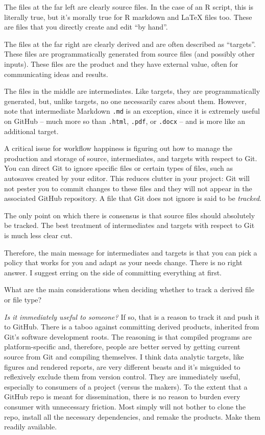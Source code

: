 \documentclass[12pt]{article}
\begin{document}
The files at the far left are clearly source files. In the case of an R
script, this is literally true, but it's morally true for R markdown and
LaTeX files too. These are files that you directly create and edit ``by
hand''.

The files at the far right are clearly derived and are often described
as ``targets''. These files are programmatically generated from source
files (and possibly other inputs). These files are the product and they
have external value, often for communicating ideas and results.

The files in the middle are intermediates. Like targets, they are
programmatically generated, but, unlike targets, no one necessarily
cares about them. However, note that intermediate Markdown \texttt{.md}
is an exception, since it is extremely useful on GitHub -- much more so
than \texttt{.html}, \texttt{.pdf}, or \texttt{.docx} -- and is more
like an additional target.

A critical issue for workflow happiness is figuring out how to manage
the production and storage of source, intermediates, and targets with
respect to Git. You can direct Git to ignore specific files or certain
types of files, such as autosaves created by your editor. This reduces
clutter in your project: Git will not pester you to commit changes to
these files and they will not appear in the associated GitHub
repository. A file that Git does not ignore is said to be
\emph{tracked}.

The only point on which there is consensus is that source files should
absolutely be tracked. The best treatment of intermediates and targets
with respect to Git is much less clear cut.

Therefore, the main message for intermediates and targets is that you
can pick a policy that works for you and adapt as your needs change.
There is no right answer. I suggest erring on the side of committing
everything at first.

What are the main considerations when deciding whether to track a
derived file or file type?

\emph{Is it immediately useful to someone?} If so, that is a reason to
track it and push it to GitHub. There is a taboo against committing
derived products, inherited from Git's software development roots. The
reasoning is that compiled programs are platform-specific and,
therefore, people are better served by getting current source from Git
and compiling themselves. I think data analytic targets, like figures
and rendered reports, are very different beasts and it's misguided to
reflexively exclude them from version control. They are immediately
useful, especially to consumers of a project (versus the makers). To the
extent that a GitHub repo is meant for dissemination, there is no reason
to burden every consumer with unnecessary friction. Most simply will not
bother to clone the repo, install all the necessary dependencies, and
remake the products. Make them readily available.
\end{document}
